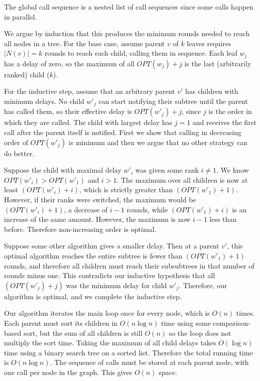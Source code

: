 \documentclass[12pt]{article}
\begin{document}
The global call sequence is a nested list of call sequences since some
calls happen in parallel.

We argue by induction
that this produces the minimum rounds needed to reach all nodes
in a tree. For the base case, assume parent $v$ of $k$ leaves
requires $|N(v)| = k$ rounds
to reach each child, calling them in sequence. Each leaf $w_j$ has a delay of
zero, so the maximum of all $OPT(w_j) + j$ is the last (arbitrarily ranked)
child ($k$).

For the inductive step, assume that an arbitrary parent $v'$
has children with minimum delays. No child $w'_j$ can start notifying
their subtree until the parent has called them, so their effective delay
is $OPT(w'_j) + j$, since $j$ is the order in which they are called.
The child with largest delay has $j=1$ and receives the first call after
the parent itself is notified. First we show that calling in
decreasing order of $OPT(w'_j)$ is minimum and then we argue that no
other strategy can do better.

Suppose the child with maximal delay $w'_i$ was given some rank $i\ne 1$.
We know $OPT(w'_i) > OPT(w'_1)$ and $i > 1$.
The maximum over all children is now at least $(OPT(w'_i) + i)$, which is
strictly greater than $(OPT(w'_1) + 1)$. However, if their ranks were switched,
the maximum would be $(OPT(w'_i)+1)$, a decrease of $i-1$ rounds, while
$(OPT(w'_1)+i)$ is an increase of the same amount. However, the maximum is now
$i-1$ less than before. Therefore non-increasing order is optimal.

Suppose some other algorithm gives a smaller delay. Then at a parent $v'$,
this optimal algorithm reaches the entire subtree is fewer than
$(OPT(w'_1)+1)$ rounds, and therefore all children must reach their
subsubtrees in that number of rounds minus one.
This contradicts our inductive hypothesis that all
$(OPT(w'_j)+j)$ was the minimum delay for child $w'_j$.
Therefore, our algorithm is optimal, and we complete the inductive step.

Our algorithm iterates the main loop once for every node, which is $O(n)$
times. Each parent must sort its children in $O(n\log{n})$ time using some
comparison-based sort, but the sum of all children is still $O(n)$ so the
loop does not multiply the sort time. Taking the maximum of all child delays
takes $O(\log{n})$ time using a binary search tree on a sorted list.
Therefore the total running time is $O(n\log{n})$.
The sequence of calls must be stored at each parent node, with one call
per node in the graph. This gives $O(n)$ space.
\end{document}
